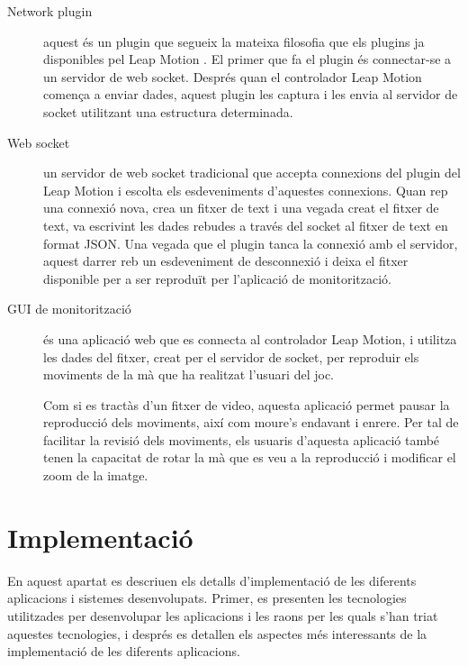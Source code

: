 \documentclass[12pt,a4paper,catalan]{article}
\begin{document}
	\begin{description}
		\item[Network plugin] aquest és un plugin que segueix la mateixa filosofia que els plugins ja disponibles pel Leap Motion \cite{leapjsplugins}. El primer que fa el plugin és connectar-se a un servidor de web socket. Després quan el controlador Leap Motion comença a enviar dades, aquest plugin les captura i les envia al servidor de socket utilitzant una estructura determinada.
		\item[Web socket] un servidor de web socket tradicional que accepta connexions del plugin del Leap Motion i escolta els esdeveniments d'aquestes connexions. Quan rep una connexió nova, crea un fitxer de text i una vegada creat el fitxer de text, va escrivint les dades rebudes a través del socket al fitxer de text en format JSON. Una vegada que el plugin tanca la connexió amb el servidor, aquest darrer reb un esdeveniment de desconnexió i deixa el fitxer disponible per a ser reproduït per l'aplicació de monitorització.
		\item[GUI de monitorització] és una aplicació web que es connecta al controlador Leap Motion, i utilitza les dades del fitxer, creat per el servidor de socket, per reproduir els moviments de la mà que ha realitzat l'usuari del joc.
		
		Com si es tractàs d'un fitxer de video, aquesta aplicació permet pausar la reproducció dels moviments, així com moure's endavant i enrere. Per tal de facilitar la revisió dels moviments, els usuaris d'aquesta aplicació també tenen la capacitat de rotar la mà que es veu a la reproducció i modificar el zoom de la imatge.
	\end{description}
	\section{Implementació}
	En aquest apartat es descriuen els detalls d’implementació de les diferents aplicacions i sistemes desenvolupats.
	Primer, es presenten les tecnologies utilitzades per desenvolupar les aplicacions i les raons per les quals s’han triat aquestes tecnologies, i després es detallen els aspectes més interessants de la implementació de les diferents aplicacions.
	
\end{document}

